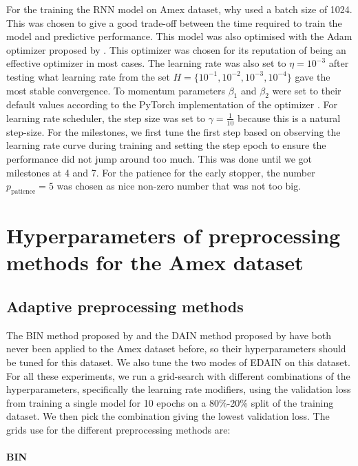 \documentclass{statsmsc}
\begin{document}
{For the training the \ac{RNN} model on Amex dataset, why used a batch size of 1024.
This was chosen to give a good trade-off between the time required to train the model and
predictive performance. This model was also optimised with the Adam optimizer proposed by
\cite{adam}. This optimizer was chosen for its reputation of being an effective optimizer in
most cases. The learning rate was also set to $\eta=10^{-3}$ after testing what learning rate
from the set $H=\{10^{-1}, 10^{-2}, 10^{-3}, 10^{-4}\}$ gave the most stable convergence.
To momentum parameters $\beta_1$ and $\beta_2$ were set to their default values according to
the PyTorch implementation of the optimizer \citep{pytorch}.
For learning rate scheduler, the step size was set to $\gamma=\frac{1}{10}$ because this is
a natural step-size. For the milestones, we first tune the first step based on observing the
learning rate curve during training and setting the step epoch to ensure the performance did not
jump around too much. This was done until we got milestones at 4 and 7.
For the patience for the early stopper, the number $p_{\textrm{patience}}=5$ was chosen as nice
non-zero number that was not too big.

\section{Hyperparameters of preprocessing methods for the Amex dataset}%
\label{sec:hyp_amex_prep}

\subsection{Adaptive preprocessing methods}

The \ac{BIN} method proposed by \cite{bin} and the \ac{DAIN} method proposed by \cite{dain} have
both never been applied to the Amex dataset before, so their hyperparameters should be tuned
for this dataset. We also tune the two modes of \ac{EDAIN} on this dataset. For all these
experiments, we run a grid-search with different combinations of the hyperparameters, specifically
the learning rate modifiers, using the validation loss from training a single model for 10
epochs on a 80\%-20\% split of the training dataset. We then pick the combination giving
the lowest validation loss. The grids use for the different preprocessing methods are:

\paragraph{BIN}%

}
\end{document}
